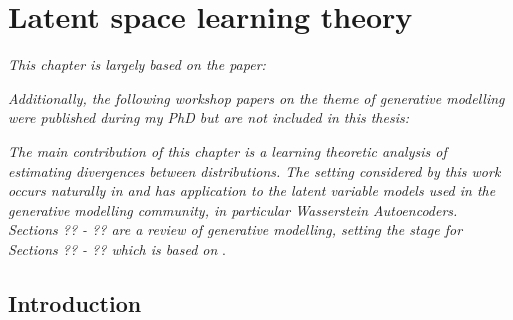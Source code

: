 \chapter{Latent space learning theory}\label{chapter:latent-space-learning-theory}

\ifpdf
    \graphicspath{{Chapter5/Figs/Raster/}{Chapter5/Figs/PDF/}{Chapter5/Figs/}}
\else
    \graphicspath{{Chapter5/Figs/Vector/}{Chapter5/Figs/}}
\fi

\emph{This chapter is largely based on the paper:}

\begin{quote}
\end{quote}

\emph{Additionally, the following workshop papers on the theme of generative modelling were published during my PhD but are not included in this thesis:}

\begin{quote}
\end{quote}

\begin{quote}
\end{quote}

\emph{The main contribution of this chapter is a learning theoretic analysis of estimating divergences between distributions. 
The setting considered by this work occurs naturally in and has application to the latent variable models used in the generative modelling community, in particular Wasserstein Autoencoders.
Sections ?? - ?? are a review of generative modelling, setting the stage for Sections ?? - ?? which is based on} \cite{rubenstein2019practical}.


\section{Introduction}

